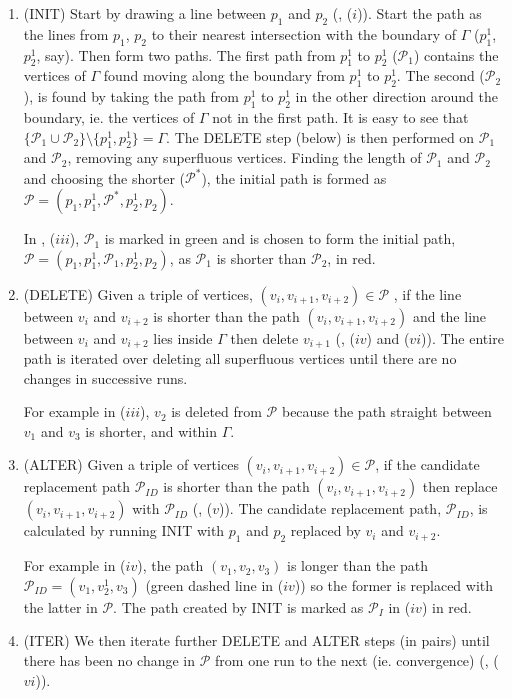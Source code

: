 \begin{enumerate}
\item (INIT) Start by drawing a line between $p_1$ and $p_2$ (, ($i$)). Start the path as the lines from $p_1$, $p_2$ to their nearest intersection with the boundary of $\Gamma$ ($p_1^1$, $p_2^1$, say). Then form two paths. The first path from $p_1^1$ to $p_2^1$ ($\mathcal{P}_1$) contains the vertices of $\Gamma$ found moving along the boundary from $p_1^1$ to $p_2^1$. The second ($\mathcal{P}_2$), is found by taking the path from $p_1^1$ to $p_2^1$ in the other direction around the boundary, ie. the vertices of $\Gamma$ not in the first path. It is easy to see that $\{\mathcal{P}_1 \cup \mathcal{P}_2\} \setminus \{p_1^1, p_2^1\} = \Gamma$. The DELETE step (below) is then performed on $\mathcal{P}_1$ and $\mathcal{P}_2$, removing any superfluous vertices. Finding the length of $\mathcal{P}_1$ and $\mathcal{P}_2$ and choosing the shorter ($\mathcal{P^*}$), the initial path is formed as $\mathcal{P}=(p_1,p_1^1,\mathcal{P}^*,p_2^1,p_2)$. 

In , ($iii$), $\mathcal{P}_1$ is marked in green and is chosen to form the initial path, $\mathcal{P}=(p_1,p_1^1,\mathcal{P}_1,p_2^1,p_2)$, as $\mathcal{P}_1$ is shorter than $\mathcal{P}_2$, in red.

\item (DELETE) Given a triple of vertices, $(v_i, v_{i+1}, v_{i+2}) \in \mathcal{P}$ , if the line between $v_i$ and $v_{i+2}$ is shorter than the path $(v_i, v_{i+1}, v_{i+2})$ and the line between $v_i$ and $v_{i+2}$ lies inside $\Gamma$ then delete $v_{i+1}$ (, ($iv$) and ($vi$)). The entire path is iterated over deleting all superfluous vertices until there are no changes in successive runs. 

For example in  ($iii$), $v_2$ is deleted from $\mathcal{P}$ because the path straight between $v_1$ and $v_3$ is shorter, and within $\Gamma$.

\item (ALTER) Given a triple of vertices $(v_i, v_{i+1}, v_{i+2}) \in \mathcal{P}$, if the candidate replacement path $\mathcal{P}_{ID}$ is shorter than the path $(v_i, v_{i+1}, v_{i+2})$ then replace $(v_i, v_{i+1}, v_{i+2})$ with $\mathcal{P}_{ID}$ (, ($v$)). The candidate replacement path, $\mathcal{P}_{ID}$, is calculated by running INIT with $p_1$ and $p_2$ replaced by $v_i$ and $v_{i+2}$.

For example in  ($iv$), the path $(v_1, v_2, v_3)$ is longer than the path $\mathcal{P}_{ID}=(v_1, v^1_2, v_3)$ (green dashed line in ($iv$)) so the former is replaced with the latter in $\mathcal{P}$. The path created by INIT is marked as $\mathcal{P}_{I}$ in  ($iv$) in red.

\item (ITER) We then iterate further DELETE and ALTER steps (in pairs) until there has been no change in $\mathcal{P}$ from one run to the next (ie. convergence) (, ($vi$)).
\end{enumerate}

